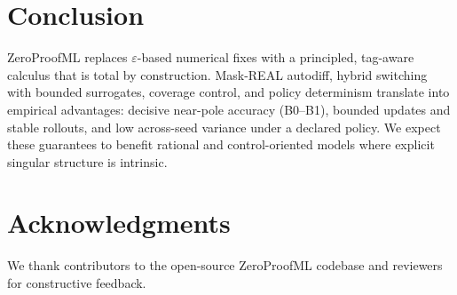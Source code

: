 \documentclass[11pt,twoside]{article}
\begin{document}
\section{Conclusion}
ZeroProofML replaces $\varepsilon$-based numerical fixes with a principled, tag-aware calculus that is total by construction. Mask-REAL autodiff, hybrid switching with bounded surrogates, coverage control, and policy determinism translate into empirical advantages: decisive near-pole accuracy (B0--B1), bounded updates and stable rollouts, and low across-seed variance under a declared policy. We expect these guarantees to benefit rational and control-oriented models where explicit singular structure is intrinsic.

\section*{Acknowledgments}
We thank contributors to the open-source ZeroProofML codebase and reviewers for constructive feedback.



\end{document}

